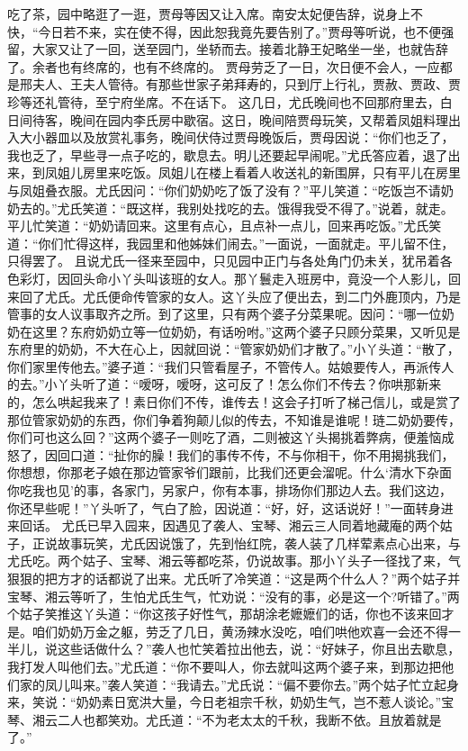 \documentclass[12pt,oneside]{book}
\begin{document}
吃了茶，园中略逛了一逛，贾母等因又让入席。南安太妃便告辞，说身上不快，“今日若不来，实在使不得，因此恕我竟先要告别了。”贾母等听说，也不便强留，大家又让了一回，送至园门，坐轿而去。接着北静王妃略坐一坐，也就告辞了。余者也有终席的，也有不终席的。
贾母劳乏了一日，次日便不会人，一应都是邢夫人、王夫人管待。有那些世家子弟拜寿的，只到厅上行礼，贾赦、贾政、贾珍等还礼管待，至宁府坐席。不在话下。
这几日，尤氏晚间也不回那府里去，白日间待客，晚间在园内李氏房中歇宿。这日，晚间陪贾母玩笑，又帮着凤姐料理出入大小器皿以及放赏礼事务，晚间伏侍过贾母晚饭后，贾母因说：“你们也乏了，我也乏了，早些寻一点子吃的，歇息去。明儿还要起早闹呢。”尤氏答应着，退了出来，到凤姐儿房里来吃饭。凤姐儿在楼上看着人收送礼的新围屏，只有平儿在房里与凤姐叠衣服。尤氏因问：“你们奶奶吃了饭了没有？”平儿笑道：“吃饭岂不请奶奶去的。”尤氏笑道：“既这样，我别处找吃的去。饿得我受不得了。”说着，就走。平儿忙笑道：“奶奶请回来。这里有点心，且点补一点儿，回来再吃饭。”尤氏笑道：“你们忙得这样，我园里和他姊妹们闹去。”一面说，一面就走。平儿留不住，只得罢了。
且说尤氏一径来至园中，只见园中正门与各处角门仍未关，犹吊着各色彩灯，因回头命小丫头叫该班的女人。那丫鬟走入班房中，竟没一个人影儿，回来回了尤氏。尤氏便命传管家的女人。这丫头应了便出去，到二门外鹿顶内，乃是管事的女人议事取齐之所。到了这里，只有两个婆子分菜果呢。因问：“哪一位奶奶在这里？东府奶奶立等一位奶奶，有话吩咐。”这两个婆子只顾分菜果，又听见是东府里的奶奶，不大在心上，因就回说：“管家奶奶们才散了。”小丫头道：“散了，你们家里传他去。”婆子道：“我们只管看屋子，不管传人。姑娘要传人，再派传人的去。”小丫头听了道：“嗳呀，嗳呀，这可反了！怎么你们不传去？你哄那新来的，怎么哄起我来了！素日你们不传，谁传去！这会子打听了梯己信儿，或是赏了那位管家奶奶的东西，你们争着狗颠儿似的传去，不知谁是谁呢！琏二奶奶要传，你们可也这么回？”这两个婆子一则吃了酒，二则被这丫头揭挑着弊病，便羞恼成怒了，因回口道：“扯你的臊！我们的事传不传，不与你相干，你不用揭挑我们，你想想，你那老子娘在那边管家爷们跟前，比我们还更会溜呢。什么‘清水下杂面你吃我也见’的事，各家门，另家户，你有本事，排场你们那边人去。我们这边，你还早些呢！”丫头听了，气白了脸，因说道：“好，好，这话说好！”一面转身进来回话。
尤氏已早入园来，因遇见了袭人、宝琴、湘云三人同着地藏庵的两个姑子，正说故事玩笑，尤氏因说饿了，先到怡红院，袭人装了几样荤素点心出来，与尤氏吃。两个姑子、宝琴、湘云等都吃茶，仍说故事。那小丫头子一径找了来，气狠狠的把方才的话都说了出来。尤氏听了冷笑道：“这是两个什么人？”两个姑子并宝琴、湘云等听了，生怕尤氏生气，忙劝说：“没有的事，必是这一个?听错了。”两个姑子笑推这丫头道：“你这孩子好性气，那胡涂老嬷嬷们的话，你也不该来回才是。咱们奶奶万金之躯，劳乏了几日，黄汤辣水没吃，咱们哄他欢喜一会还不得一半儿，说这些话做什么？”袭人也忙笑着拉出他去，说：“好妹子，你且出去歇息，我打发人叫他们去。”尤氏道：“你不要叫人，你去就叫这两个婆子来，到那边把他们家的凤儿叫来。”袭人笑道：“我请去。”尤氏说：“偏不要你去。”两个姑子忙立起身来，笑说：“奶奶素日宽洪大量，今日老祖宗千秋，奶奶生气，岂不惹人谈论。”宝琴、湘云二人也都笑劝。尤氏道：“不为老太太的千秋，我断不依。且放着就是了。”
\end{document}

